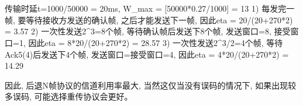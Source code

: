 \documentclass{zpt}
\begin{document}
\section{}
传输时延t=1000/50000 = 20ms, W_{max} = [50000*0.27/1000] = 13
1) 每发完一帧, 要等待接收方发送的确认帧, 之后才能发送下一帧, 因此eta = 20/(20+270*2) = 3.57%
2) 一次性发送2^3=8个帧, 等待确认帧后发送下8个帧, 发送窗口=8, 接受窗口=1, 因此eta = 8*20/(20+270*2) = 28.57%
3) 一次性发送2^3/2=4个帧, 等待Ack5(4)后发送下4个帧, 发送窗口=接受窗口=4, 因此eta = 4*20/(20+270*2) = 14.29%

因此, 后退N帧协议的信道利用率最大, 当然这仅当没有误码的情况下, 如果出现较多误码, 可能选择重传协议会更好。
\end{document}
